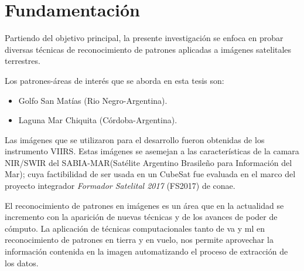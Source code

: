 \section{Fundamentación}\label{sec:fundamentacion}
Partiendo del objetivo principal, la presente investigación se enfoca en probar diversas técnicas de reconocimiento de patrones aplicadas a imágenes satelitales terrestres.  

Los patrones-áreas de interés que se aborda en esta tesis son:
\begin{itemize}
	\item Golfo San Matías (Rio Negro-Argentina).
	\item Laguna Mar Chiquita (Córdoba-Argentina).
\end{itemize}

Las imágenes que se utilizaron para el desarrollo fueron obtenidas de los instrumento  VIIRS. Estas imágenes se asemejan a las características de la camara NIR/SWIR del SABIA-MAR(Satélite Argentino Brasileño para Información del Mar); cuya factibilidad de ser usada en un CubeSat fue evaluada en el marco del proyecto integrador \textit{Formador Satelital 2017} (FS2017) de \ac{conae}.

El reconocimiento de patrones en imágenes es un área que en la actualidad se incremento con la aparición de nuevas técnicas y de los avances de poder de cómputo. La aplicación de técnicas computacionales tanto de  \ac{va} y \ac{ml} en reconocimiento de patrones  en tierra y en vuelo, nos permite aprovechar la información contenida en la imagen  automatizando el proceso de extracción de los datos.

